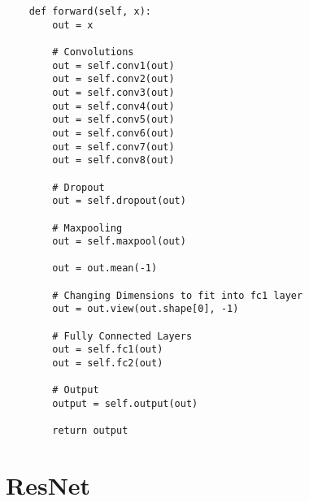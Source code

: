 \documentclass[
thesis  %
]{csthes}
\begin{document}
\begin{lstlisting}
    def forward(self, x):
        out = x

        # Convolutions
        out = self.conv1(out)
        out = self.conv2(out)
        out = self.conv3(out)
        out = self.conv4(out)
        out = self.conv5(out)
        out = self.conv6(out)
        out = self.conv7(out)
        out = self.conv8(out)

        # Dropout
        out = self.dropout(out)

        # Maxpooling
        out = self.maxpool(out)

        out = out.mean(-1)

        # Changing Dimensions to fit into fc1 layer
        out = out.view(out.shape[0], -1)

        # Fully Connected Layers
        out = self.fc1(out)
        out = self.fc2(out)

        # Output
        output = self.output(out)

        return output
\end{lstlisting}

\section{ResNet}
\end{document}
